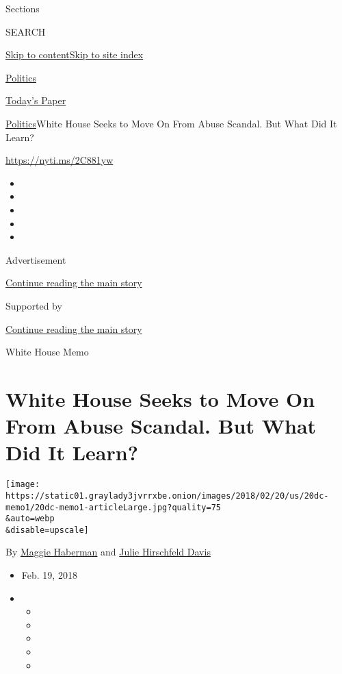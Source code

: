 Sections

SEARCH

\protect\hyperlink{site-content}{Skip to
content}\protect\hyperlink{site-index}{Skip to site index}

\href{https://www.nytimes3xbfgragh.onion/section/politics}{Politics}

\href{https://myaccount.nytimes3xbfgragh.onion/auth/login?response_type=cookie\&client_id=vi}{}

\href{https://www.nytimes3xbfgragh.onion/section/todayspaper}{Today's
Paper}

\href{/section/politics}{Politics}\textbar{}White House Seeks to Move On
From Abuse Scandal. But What Did It Learn?

\url{https://nyti.ms/2C881yw}

\begin{itemize}
\item
\item
\item
\item
\item
\end{itemize}

Advertisement

\protect\hyperlink{after-top}{Continue reading the main story}

Supported by

\protect\hyperlink{after-sponsor}{Continue reading the main story}

White House Memo

\hypertarget{white-house-seeks-to-move-on-from-abuse-scandal-but-what-did-it-learn}{%
\section{White House Seeks to Move On From Abuse Scandal. But What Did
It
Learn?}\label{white-house-seeks-to-move-on-from-abuse-scandal-but-what-did-it-learn}}

\texttt{[image: https://static01.graylady3jvrrxbe.onion/images/2018/02/20/us/20dc-memo1/20dc-memo1-articleLarge.jpg?quality=75\\\&auto=webp\\\&disable=upscale]}

By \href{http://www.nytimes3xbfgragh.onion/by/maggie-haberman}{Maggie
Haberman} and
\href{https://www.nytimes3xbfgragh.onion/by/julie-hirschfeld-davis}{Julie
Hirschfeld Davis}

\begin{itemize}
\item
  Feb. 19, 2018
\item
  \begin{itemize}
  \item
  \item
  \item
  \item
  \item
  \end{itemize}
\end{itemize}

